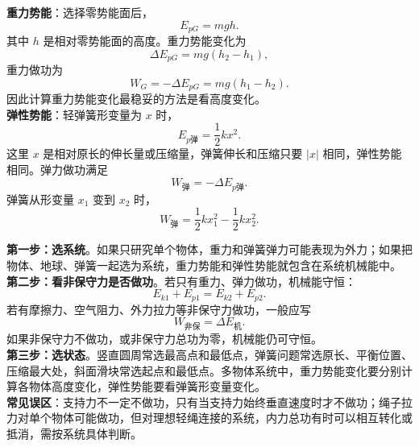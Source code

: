 \begin{keypointbox}[title={\strut\textcolor{white}{\bfseries 重点知识点：势能的定义与计算}}]
\textbf{重力势能}：选择零势能面后，
\[
  E_{pG}=mgh.
\]
其中 $h$ 是相对零势能面的高度。重力势能变化为
\[
  \Delta E_{pG}=mg(h_2-h_1),
\]
重力做功为
\[
  W_G=-\Delta E_{pG}=mg(h_1-h_2).
\]
因此计算重力势能变化最稳妥的方法是看高度变化。\\

\textbf{弹性势能}：轻弹簧形变量为 $x$ 时，
\[
  E_{p\text{弹}}=\frac12kx^2.
\]
这里 $x$ 是相对原长的伸长量或压缩量，弹簧伸长和压缩只要 $|x|$ 相同，弹性势能相同。弹力做功满足
\[
  W_{\text{弹}}=-\Delta E_{p\text{弹}}.
\]
弹簧从形变量 $x_1$ 变到 $x_2$ 时，
\[
  W_{\text{弹}}=\frac12kx_1^2-\frac12kx_2^2.
\]
\end{keypointbox}

\begin{casetypebox}[title={\strut\textcolor{white}{\bfseries 常见题型：机械能守恒判定与列式}}]
\textbf{第一步：选系统}。如果只研究单个物体，重力和弹簧弹力可能表现为外力；如果把物体、地球、弹簧一起选为系统，重力势能和弹性势能就包含在系统机械能中。\\

\textbf{第二步：看非保守力是否做功}。若只有重力、弹力做功，机械能守恒：
\[
  E_{k1}+E_{p1}=E_{k2}+E_{p2}.
\]
若有摩擦力、空气阻力、外力拉力等非保守力做功，一般应写
\[
  W_{\text{非保}}=\Delta E_{\text{机}}.
\]
如果非保守力不做功，或非保守力总功为零，机械能仍可守恒。\\

\textbf{第三步：选状态}。竖直圆周常选最高点和最低点，弹簧问题常选原长、平衡位置、压缩最大处，斜面滑块常选起点和最低点。多物体系统中，重力势能变化要分别计算各物体高度变化，弹性势能要看弹簧形变量变化。\\

\textbf{常见误区}：支持力不一定不做功，只有当支持力始终垂直速度时才不做功；绳子拉力对单个物体可能做功，但对理想轻绳连接的系统，内力总功有时可以相互转化或抵消，需按系统具体判断。
\end{casetypebox}
